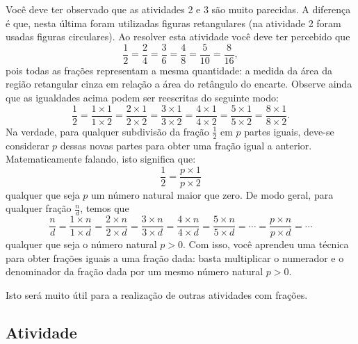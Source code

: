 \documentclass[a4,12pt]{book}
\begin{document}
\begin{refletindo*}[breakable]{}{}  
  Você deve ter observado que as atividades 2 e 3 são muito parecidas.   
  A diferença é que, nesta última foram utilizadas figuras retangulares (na atividade 2 foram usadas figuras circulares).   
  Ao resolver esta atividade você deve ter percebido que   
  $$\dfrac{1}{2}=\dfrac{2}{4}=\dfrac{3}{6}=\dfrac{4}{8}=\dfrac{5}{10}=\dfrac{8}{16},$$  
  pois todas as frações representam a mesma quantidade: a medida da área da região retangular cinza em relação a área do retângulo do encarte.  
  Observe ainda que as igualdades acima podem ser reescritas do seguinte modo:  
  $$\dfrac{1}{2}=\dfrac{1 \times 1}{1 \times 2}= \dfrac{2 \times 1}{2 \times 2} =\dfrac{3 \times 1}{3 \times 2} = \dfrac{4 \times 1}{4 \times 2} = \dfrac{5 \times 1}{5 \times 2}= \dfrac{8 \times 1}{8 \times 2}.$$  
  Na verdade, para qualquer subdivisão da fração   $\frac{1}{2}$    em   $p$   partes iguais, deve-se considerar   $p$   dessas novas partes para obter uma fração igual a anterior. Matematicamente falando, isto significa que:  
  $$\dfrac{1}{2}= \dfrac{p \times 1}{p \times 2}$$     
  qualquer que seja   $p$   um número natural maior que zero.  
  De modo geral, para qualquer fração    $\frac{n}{d}$,  temos que  
  $$\dfrac{n}{d}=\dfrac{1 \times n}{1 \times d}= \dfrac{2 \times n}{2 \times d} = \dfrac{3 \times n}{3 \times d} = \dfrac{4 \times n}{4 \times d} = \dfrac{5 \times n}{5 \times d}=\cdots =  \dfrac{p \times n}{p \times d}= \cdots$$  
  qualquer que seja o número natural   $p > 0$.  
  Com isso, você aprendeu uma técnica para obter frações iguais a uma fração dada: basta multiplicar o numerador e o denominador da fração dada por um mesmo número natural   $p > 0$.   
  
  Isto será muito útil para a realização de outras atividades com frações.  
\end{refletindo*}



\subsection{Atividade}
\end{document}
